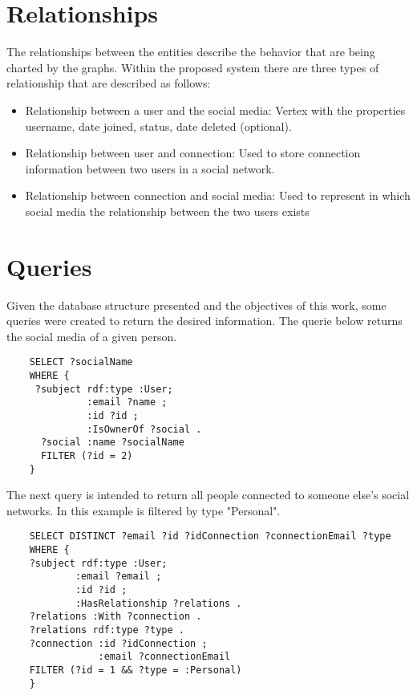 \section{Relationships}

The relationships between the entities describe the behavior that are being charted by the graphs. Within the proposed system there are three types of relationship that are described as follows:

\begin{itemize}
    \item Relationship between a user and the social media: Vertex with the properties username, date joined, status, date deleted (optional).
    \item Relationship between user and connection: Used to store connection information between two users in a social network.
    \item Relationship between connection and social media: Used to represent in which social media the relationship between the two users exists
\end{itemize}


\section{Queries}

Given the database structure presented and the objectives of this work, some queries were created to return the desired information. 
The querie below returns the social media of a given person.
\begin{verbatim}
    SELECT ?socialName
    WHERE {
     ?subject rdf:type :User;
              :email ?name ;
              :id ?id ;
              :IsOwnerOf ?social .
      ?social :name ?socialName
      FILTER (?id = 2)
    }
\end{verbatim}


The next query is intended to return all people connected to someone else's social networks. In this example is filtered by type "Personal".

\begin{verbatim}
    SELECT DISTINCT ?email ?id ?idConnection ?connectionEmail ?type
    WHERE {
    ?subject rdf:type :User;
            :email ?email ;
            :id ?id ;
            :HasRelationship ?relations .
    ?relations :With ?connection .
    ?relations rdf:type ?type .
    ?connection :id ?idConnection ;
                :email ?connectionEmail
    FILTER (?id = 1 && ?type = :Personal)
    }
\end{verbatim}

